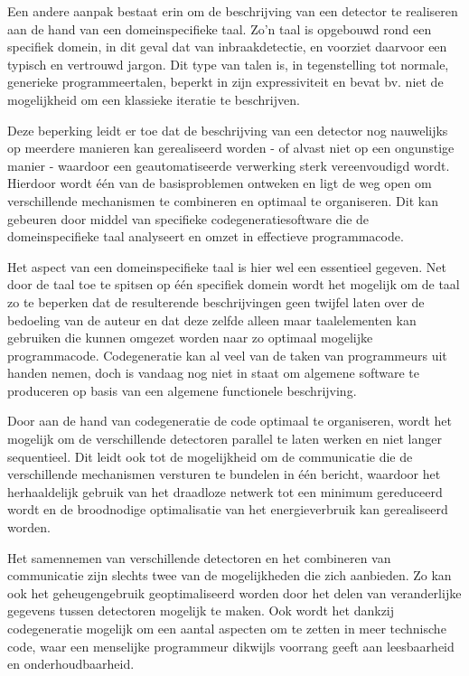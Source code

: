 \documentclass[DIV=calc,paper=a4,fontsize=11pt,twocolumn,draft]{scrartcl}
\begin{document}
Een andere aanpak bestaat erin om de beschrijving van een detector te
realiseren aan de hand van een domeinspecifieke taal. Zo'n taal is opgebouwd
rond een specifiek domein, in dit geval dat van inbraakdetectie, en voorziet
daarvoor een typisch en vertrouwd jargon. Dit type van talen is, in
tegenstelling tot normale, generieke programmeertalen, beperkt in zijn
expressiviteit en bevat bv. niet de mogelijkheid om een klassieke iteratie te
beschrijven.

Deze beperking leidt er toe dat de beschrijving van een detector nog nauwelijks
op meerdere manieren kan gerealiseerd worden - of alvast niet op een ongunstige
manier - waardoor een geautomatiseerde verwerking sterk vereenvoudigd wordt.
Hierdoor wordt \'e\'en van de basisproblemen ontweken en ligt de weg open om
verschillende mechanismen te combineren en optimaal te organiseren. Dit kan
gebeuren door middel van specifieke codegeneratiesoftware die de
domeinspecifieke taal analyseert en omzet in effectieve programmacode.

Het aspect van een domeinspecifieke taal is hier wel een essentieel gegeven.
Net door de taal toe te spitsen op \'e\'en specifiek domein wordt het mogelijk
om de taal zo te beperken dat de resulterende beschrijvingen geen twijfel laten
over de bedoeling van de auteur en dat deze zelfde alleen maar taalelementen
kan gebruiken die kunnen omgezet worden naar zo optimaal mogelijke
programmacode. Codegeneratie kan al veel van de taken van programmeurs uit
handen nemen, doch is vandaag nog niet in staat om algemene software te
produceren op basis van een algemene functionele beschrijving.

Door aan de hand van codegeneratie de code optimaal te organiseren, wordt het
mogelijk om de verschillende detectoren parallel te laten werken en niet langer
sequentieel. Dit leidt ook tot de mogelijkheid om de communicatie die de
verschillende mechanismen versturen te bundelen in \'e\'en bericht, waardoor
het herhaaldelijk gebruik van het draadloze netwerk tot een minimum gereduceerd
wordt en de broodnodige optimalisatie van het energieverbruik kan gerealiseerd
worden.

Het samennemen van verschillende detectoren en het combineren van communicatie
zijn slechts twee van de mogelijkheden die zich aanbieden. Zo kan ook het
geheugengebruik geoptimaliseerd worden door het delen van veranderlijke
gegevens tussen detectoren mogelijk te maken. Ook wordt het dankzij
codegeneratie mogelijk om een aantal aspecten om te zetten in meer technische
code, waar een menselijke programmeur dikwijls voorrang geeft aan leesbaarheid
en onderhoudbaarheid.
\end{document}
